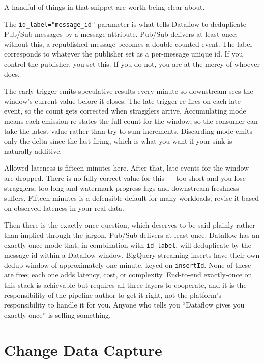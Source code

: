 \documentclass[
  11pt,
  british,
  oneside]{book}
\begin{document}
A handful of things in that snippet are worth being clear about.

The \texttt{id\_label="message\_id"} parameter is what tells Dataflow to
deduplicate Pub/Sub messages by a message attribute. Pub/Sub delivers
at-least-once; without this, a republished message becomes a
double-counted event. The label corresponds to whatever the publisher
set as a per-message unique id. If you control the publisher, you set
this. If you do not, you are at the mercy of whoever does.

The early trigger emits speculative results every minute so downstream
sees the window's current value before it closes. The late trigger
re-fires on each late event, so the count gets corrected when stragglers
arrive. Accumulating mode means each emission re-states the full count
for the window, so the consumer can take the latest value rather than
try to sum increments. Discarding mode emits only the delta since the
last firing, which is what you want if your sink is naturally additive.

Allowed lateness is fifteen minutes here. After that, late events for
the window are dropped. There is no fully correct value for this --- too
short and you lose stragglers, too long and watermark progress lags and
downstream freshness suffers. Fifteen minutes is a defensible default
for many workloads; revise it based on observed lateness in your real
data.

Then there is the exactly-once question, which deserves to be said
plainly rather than implied through the jargon. Pub/Sub delivers
at-least-once. Dataflow has an exactly-once
mode that, in combination with \texttt{id\_label}, will deduplicate by
the message id within a Dataflow window. BigQuery streaming inserts have
their own dedup window of approximately one minute, keyed on
\texttt{insertId}. None of these are free; each one adds latency, cost,
or complexity. End-to-end exactly-once on this stack is achievable but
requires all three layers to cooperate, and it is the responsibility of
the pipeline author to get it right, not the platform's responsibility
to handle it for you. Anyone who tells you ``Dataflow gives you
exactly-once'' is selling something.

\hypertarget{change-data-capture}{%
\section{Change Data Capture}\label{change-data-capture}}
\end{document}
